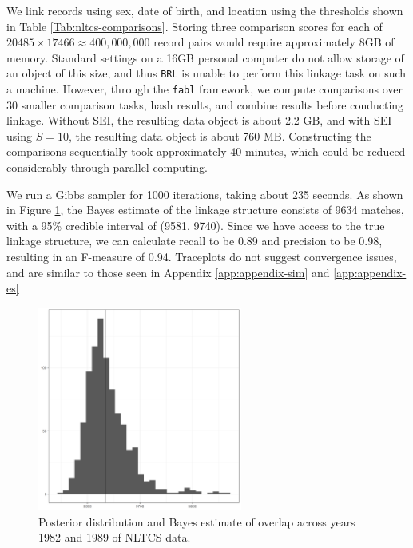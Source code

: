 \documentclass[ba]{imsart}
\begin{document}
	We link records using sex, date of birth, and location using the thresholds shown in Table \ref{Tab:nltcs-comparisons}. Storing three comparison scores for each of $20485 \times 17466 \approx 400,000,000$ record pairs would require approximately 8GB of memory. Standard settings on a 16GB personal computer do not allow storage of an object of this size, and thus \texttt{BRL} is unable to perform this linkage task on such a machine. However, through the \texttt{fabl} framework, we compute comparisons over 30 smaller comparison tasks, hash results, and combine results before conducting linkage. Without SEI, the resulting data object is about 2.2 GB, and with SEI using $S=10$, the resulting data object is about 760 MB. Constructing the comparisons sequentially took approximately 40 minutes, which could be reduced considerably through parallel computing. 
	
	We run a Gibbs sampler for 1000 iterations, taking about 235 seconds. As shown in Figure \ref{fig:nltcs-overlap-plot}, the Bayes estimate of the linkage structure consists of 9634 matches, with a 95\% credible interval of (9581, 9740). Since we have access to the true linkage structure, we can calculate recall to be 0.89 and precision to be 0.98, resulting in an F-measure of 0.94. Traceplots do not suggest convergence issues, and are similar to those seen in Appendix \ref{app:appendix-sim} and \ref{app:appendix-es}
	
	\begin{figure}[h]
		\begin{center}
			\includegraphics[width=0.6\textwidth]{../notes/figures/nltcs/overlap_posterior4}
			\caption{Posterior distribution and Bayes estimate of overlap across years 1982 and 1989 of NLTCS data.}
			\label{fig:nltcs-overlap-plot}
		\end{center}
	\end{figure}
	
\end{document}
